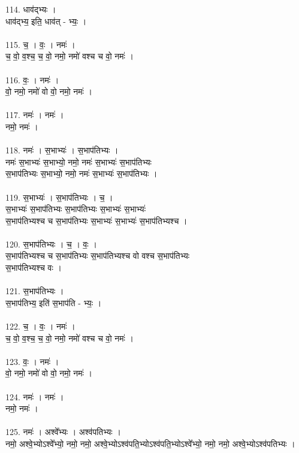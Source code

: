 114. धाव॑द्भ्यः ।\\
धाव॑द्भ्य॒ इति॒ धाव॑त् - भ्यः॒ ।\\
\\
115. च॒ । वः॒ । नमः॑ ।\\
च॒ वो॒ व॒श्च॒ च॒ वो॒ नमो॒ नमो॑ वश्च च वो॒ नमः॑ ।\\
\\
116. वः॒ । नमः॑ ।\\
वो॒ नमो॒ नमो॑ वो वो॒ नमो॒ नमः॑ ।\\
\\
117. नमः॑ । नमः॑ ।\\
नमो॒ नमः॑ ।\\
\\
118. नमः॑ । स॒भाभ्यः॑ । स॒भाप॑तिभ्यः ।\\
नमः॑ स॒भाभ्यः॑ स॒भाभ्यो॒ नमो॒ नमः॑ स॒भाभ्यः॑ स॒भाप॑तिभ्यः\\
स॒भाप॑तिभ्यः स॒भाभ्यो॒ नमो॒ नमः॑ स॒भाभ्यः॑ स॒भाप॑तिभ्यः ।\\
\\
119. स॒भाभ्यः॑ । स॒भाप॑तिभ्यः । च॒ ।\\
स॒भाभ्यः॑ स॒भाप॑तिभ्यः स॒भाप॑तिभ्यः स॒भाभ्यः॑ स॒भाभ्यः॑\\
स॒भाप॑तिभ्यश्च च स॒भाप॑तिभ्यः स॒भाभ्यः॑ स॒भाभ्यः॑ स॒भाप॑तिभ्यश्च ।\\
\\
120. स॒भाप॑तिभ्यः । च॒ । वः॒ ।\\
स॒भाप॑तिभ्यश्च च स॒भाप॑तिभ्यः स॒भाप॑तिभ्यश्च वो वश्च स॒भाप॑तिभ्यः\\
स॒भाप॑तिभ्यश्च वः ।\\
\\
121. स॒भाप॑तिभ्यः ।\\
स॒भाप॑तिभ्य॒ इति॑ स॒भाप॑ति - भ्यः॒ ।\\
\\
122. च॒ । वः॒ । नमः॑ ।\\
च॒ वो॒ व॒श्च॒ च॒ वो॒ नमो॒ नमो॑ वश्च च वो॒ नमः॑ ।\\
\\
123. वः॒ । नमः॑ ।\\
वो॒ नमो॒ नमो॑ वो वो॒ नमो॒ नमः॑ ।\\
\\
124. नमः॑ । नमः॑ ।\\
नमो॒ नमः॑ ।\\
\\
125. नमः॑ । अश्वे᳚भ्यः । अश्व॑पतिभ्यः ।\\
नमो॒ अश्वे॒भ्योऽश्वे᳚भ्यो॒ नमो॒ नमो॒ अश्वे॒भ्योऽश्व॑पति॒भ्योऽश्व॑पति॒भ्योऽश्वे᳚भ्यो॒ नमो॒ नमो॒ अश्वे॒भ्योऽश्व॑पतिभ्यः ।\\
